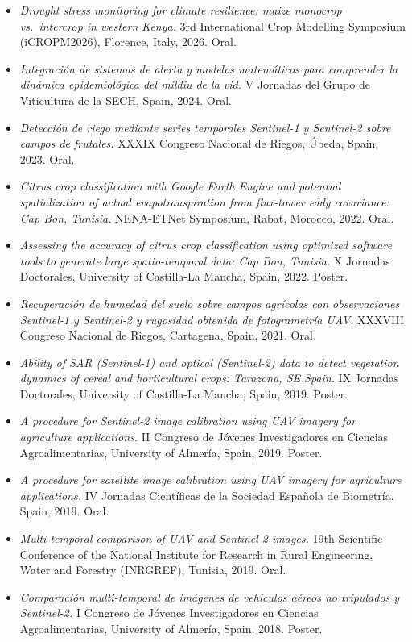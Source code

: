 \documentclass[10pt, a4paper]{article}
\newenvironment{highlights}{
    \begin{itemize}[
        topsep=0.10cm,
        parsep=0.10cm,
        partopsep=0pt,
        itemsep=0pt,
        leftmargin=0cm + 10pt
    ]
}{
    \end{itemize}
}
\begin{document}
\begin{highlights}
    \item \emph{Drought stress monitoring for climate resilience: maize monocrop vs.\ intercrop in western Kenya.} 3rd International Crop Modelling Symposium (iCROPM2026), Florence, Italy, 2026. Oral.
    \item \emph{Integración de sistemas de alerta y modelos matemáticos para comprender la dinámica epidemiológica del mildiu de la vid.} V Jornadas del Grupo de Viticultura de la SECH, Spain, 2024. Oral.
    \item \emph{Detección de riego mediante series temporales Sentinel-1 y Sentinel-2 sobre campos de frutales.} XXXIX Congreso Nacional de Riegos, Úbeda, Spain, 2023. Oral.
    \item \emph{Citrus crop classification with Google Earth Engine and potential spatialization of actual evapotranspiration from flux-tower eddy covariance: Cap Bon, Tunisia.} NENA-ETNet Symposium, Rabat, Morocco, 2022. Oral.
    \item \emph{Assessing the accuracy of citrus crop classification using optimized software tools to generate large spatio-temporal data: Cap Bon, Tunisia.} X Jornadas Doctorales, University of Castilla-La Mancha, Spain, 2022. Poster.
    \item \emph{Recuperación de humedad del suelo sobre campos agrícolas con observaciones Sentinel-1 y Sentinel-2 y rugosidad obtenida de fotogrametría UAV.} XXXVIII Congreso Nacional de Riegos, Cartagena, Spain, 2021. Oral.
    \item \emph{Ability of SAR (Sentinel-1) and optical (Sentinel-2) data to detect vegetation dynamics of cereal and horticultural crops: Tarazona, SE Spain.} IX Jornadas Doctorales, University of Castilla-La Mancha, Spain, 2019. Poster.
    \item \emph{A procedure for Sentinel-2 image calibration using UAV imagery for agriculture applications.} II Congreso de Jóvenes Investigadores en Ciencias Agroalimentarias, University of Almería, Spain, 2019. Poster.
    \item \emph{A procedure for satellite image calibration using UAV imagery for agriculture applications.} IV Jornadas Científicas de la Sociedad Española de Biometría, Spain, 2019. Oral.
    \item \emph{Multi-temporal comparison of UAV and Sentinel-2 images.} 19th Scientific Conference of the National Institute for Research in Rural Engineering, Water and Forestry (INRGREF), Tunisia, 2019. Oral.
    \item \emph{Comparación multi-temporal de imágenes de vehículos aéreos no tripulados y Sentinel-2.} I Congreso de Jóvenes Investigadores en Ciencias Agroalimentarias, University of Almería, Spain, 2018. Poster.
\end{highlights}
\end{document}
